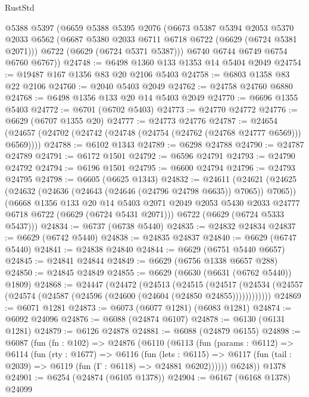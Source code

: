 \begin{lexlean}{RustStd}
\begin{coremodule}
      @5388
      @5397
      (@6659
        @5388
        @5395
        @2076
        (@6673
          @5387
          @5394
          @2053
          @5370
          @2033
          @6562
          (@6687 @5380 @2033 @6711 @6718 @6722 (@6629 (@6724 @5381 @2071)))
          @6722
          (@6629 (@6724 @5371 @5387)))
        @6740
        @6744
        @6749
        @6754
        @6760
        @6767))
@24748 := @6498 @1360 @133 @1353 @14 @5404 @2049
@24754 := @19487 @167 @1356 @83 @20 @2106 @5403
@24758 := @6803 @1358 @83 @22 @2106
@24760 := @2040 @5403 @2049
@24762 := @24758 @24760 @6880
@24768 := @6498 @1356 @133 @20 @14 @5403 @2049
@24770 := @6696 @1355 @5403
@24772 := @6701 (@6702 @5403)
@24773 := @24770 @24772
@24776 := @6629 (@6707 @1355 @20)
@24777 := @24773 @24776
@24787 := @24654 (@24657 (@24702 (@24742 (@24748 (@24754 (@24762 (@24768 @24777 @6569))) @6569))))
@24788 := @6102 @1343
@24789 := @6298 @24788
@24790 := @24787 @24789
@24791 := @6172 @1501
@24792 := @6596 @24791
@24793 := @24790 @24792
@24794 := @6196 @1501
@24795 := @6600 @24794
@24796 := @24793 @24795
@24798 := @6605 (@6625 @1343)
@24832 := @24611
    (@24621
      (@24625 (@24632 (@24636 (@24643 (@24646 (@24796 @24798 @6635)) @7065)) @7065))
      (@6668
        @1356
        @133
        @20
        @14
        @5403
        @2071
        @2049
        @2053
        @5430
        @2033
        @24777
        @6718
        @6722
        (@6629 (@6724 @5431 @2071)))
      @6722
      (@6629 (@6724 @5333 @5437)))
@24834 := @6737 (@6738 @5440)
@24835 := @24832 @24834
@24837 := @6629 (@6742 @5440)
@24838 := @24835 @24837
@24840 := @6629 (@6747 @5440)
@24841 := @24838 @24840
@24844 := @6629 (@6751 @5440 @6657)
@24845 := @24841 @24844
@24849 := @6629 (@6756 @1338 @6657 @288)
@24850 := @24845 @24849
@24855 := @6629 (@6630 (@6631 (@6762 @5440)) @1809)
@24868 := @24447
    (@24472
      (@24513
        (@24515
          (@24517 (@24534 (@24557 (@24574 (@24587 (@24596 (@24600 (@24604 (@24850 @24855))))))))))))
@24869 := @6071 @1281
@24873 := @6073 (@6077 @1281) (@6083 @1281)
@24874 := @6092 @24096
@24876 := @6088 (@24874 @6107)
@24878 := @6130 (@6131 @1281)
@24879 := @6126 @24878
@24881 := @6088 (@24879 @6155)
@24898 := @6087
    (fun (fn : @102) =>
    @24876
      (@6110
        (@6113
          (fun (params : @6112) =>
          @6114
            (fun (rty : @1677) =>
            @6116
              (fun (lets : @6115) =>
              @6117 (fun (tail : @2039) => @6119 (fun (Γ : @6118) => @24881 @6202))))))
        @6248))
    @1378
@24901 := @6254 (@24874 (@6105 @1378))
@24904 := @6167 (@6168 @1378) @24099

\end{coremodule}
\end{lexlean}
